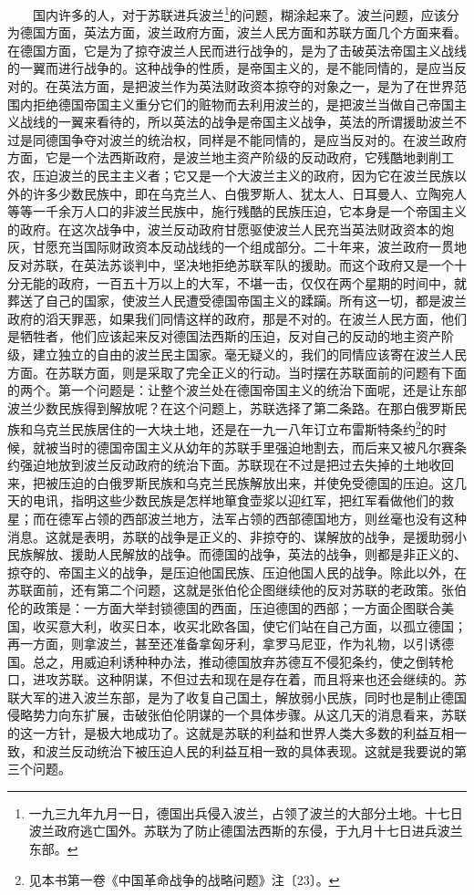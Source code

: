 \documentclass[cn,11pt,chinese]{elegantbook}
\begin{document}
　　国内许多的人，对于苏联进兵波兰\footnote[8]{ 一九三九年九月一日，德国出兵侵入波兰，占领了波兰的大部分土地。十七日波兰政府逃亡国外。苏联为了防止德国法西斯的东侵，于九月十七日进兵波兰东部。}的问题，糊涂起来了。波兰问题，应该分为德国方面，英法方面，波兰政府方面，波兰人民方面和苏联方面几个方面来看。在德国方面，它是为了掠夺波兰人民而进行战争的，是为了击破英法帝国主义战线的一翼而进行战争的。这种战争的性质，是帝国主义的，是不能同情的，是应当反对的。在英法方面，是把波兰作为英法财政资本掠夺的对象之一，是为了在世界范围内拒绝德国帝国主义重分它们的赃物而去利用波兰的，是把波兰当做自己帝国主义战线的一翼来看待的，所以英法的战争是帝国主义战争，英法的所谓援助波兰不过是同德国争夺对波兰的统治权，同样是不能同情的，是应当反对的。在波兰政府方面，它是一个法西斯政府，是波兰地主资产阶级的反动政府，它残酷地剥削工农，压迫波兰的民主主义者；它又是一个大波兰主义的政府，因为它在波兰民族以外的许多少数民族中，即在乌克兰人、白俄罗斯人、犹太人、日耳曼人、立陶宛人等等一千余万人口的非波兰民族中，施行残酷的民族压迫，它本身是一个帝国主义的政府。在这次战争中，波兰反动政府甘愿驱使波兰人民充当英法财政资本的炮灰，甘愿充当国际财政资本反动战线的一个组成部分。二十年来，波兰政府一贯地反对苏联，在英法苏谈判中，坚决地拒绝苏联军队的援助。而这个政府又是一个十分无能的政府，一百五十万以上的大军，不堪一击，仅仅在两个星期的时间中，就葬送了自己的国家，使波兰人民遭受德国帝国主义的蹂躏。所有这一切，都是波兰政府的滔天罪恶，如果我们同情这样的政府，那是不对的。在波兰人民方面，他们是牺牲者，他们应该起来反对德国法西斯的压迫，反对自己的反动的地主资产阶级，建立独立的自由的波兰民主国家。毫无疑义的，我们的同情应该寄在波兰人民方面。在苏联方面，则是采取了完全正义的行动。当时摆在苏联面前的问题有下面的两个。第一个问题是：让整个波兰处在德国帝国主义的统治下面呢，还是让东部波兰少数民族得到解放呢？在这个问题上，苏联选择了第二条路。在那白俄罗斯民族和乌克兰民族居住的一大块土地，还是在一九一八年订立布雷斯特条约\footnote[9]{ 见本书第一卷《中国革命战争的战略问题》注〔23〕。}的时候，就被当时的德国帝国主义从幼年的苏联手里强迫地割去，而后来又被凡尔赛条约强迫地放到波兰反动政府的统治下面。苏联现在不过是把过去失掉的土地收回来，把被压迫的白俄罗斯民族和乌克兰民族解放出来，并使免受德国的压迫。这几天的电讯，指明这些少数民族是怎样地箪食壶浆以迎红军，把红军看做他们的救星；而在德军占领的西部波兰地方，法军占领的西部德国地方，则丝毫也没有这种消息。这就是表明，苏联的战争是正义的、非掠夺的、谋解放的战争，是援助弱小民族解放、援助人民解放的战争。而德国的战争，英法的战争，则都是非正义的、掠夺的、帝国主义的战争，是压迫他国民族、压迫他国人民的战争。除此以外，在苏联面前，还有第二个问题，这就是张伯伦企图继续他的反对苏联的老政策。张伯伦的政策是：一方面大举封锁德国的西面，压迫德国的西部；一方面企图联合美国，收买意大利，收买日本，收买北欧各国，使它们站在自己方面，以孤立德国；再一方面，则拿波兰，甚至还准备拿匈牙利，拿罗马尼亚，作为礼物，以引诱德国。总之，用威迫利诱种种办法，推动德国放弃苏德互不侵犯条约，使之倒转枪口，进攻苏联。这种阴谋，不但过去和现在是存在着，而且将来也还会继续的。苏联大军的进入波兰东部，是为了收复自己国土，解放弱小民族，同时也是制止德国侵略势力向东扩展，击破张伯伦阴谋的一个具体步骤。从这几天的消息看来，苏联的这一方针，是极大地成功了。这就是苏联的利益和世界人类大多数的利益互相一致，和波兰反动统治下被压迫人民的利益互相一致的具体表现。这就是我要说的第三个问题。\\
\end{document}
